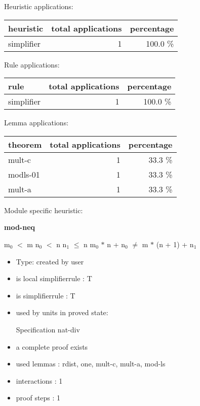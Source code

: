 \documentclass[a4paper]{article}
\begin{document}
\medskip


Heuristic applications:

\begin{supertabular}{l|r|r}
heuristic	& total applications & percentage \\ \hline
simplifier & 1 & 100.0 \% \\

\end{supertabular}

Rule applications:

\begin{supertabular}{l|r|r}
rule	        & total applications & percentage \\ \hline
simplifier & 1 & 100.0 \% \\

\end{supertabular}

Lemma applications:

\begin{supertabular}{l|r|r}
theorem	        & total applications & percentage \\ \hline
mult-c & 1 & 33.3 \% \\
modls-01 & 1 & 33.3 \% \\
mult-a & 1 & 33.3 \% \\

\end{supertabular}

Module specific heuristic:

\pagebreak

{\LARGE\bf mod-neq}\label{lemma-mod-neq}

\medskip

 \Fol $\mbox{m}_{0}$ $<$ m \And $\mbox{n}_{0}$ $<$ n \And $\mbox{n}_{1}$ $\le$ n \Imp $\mbox{m}_{0}$ $*$ n + $\mbox{n}_{0}$ $\neq$ m $*$ (n + 1) + $\mbox{n}_{1}$

\begin{itemize}

\item Type: created by user

\item is local simplifierrule : T
\item is simplifierrule : T
\item used by units in proved state:

Specification nat-div
\item       a complete proof exists
\item       used lemmas  : rdist, one, mult-c, mult-a, mod-ls
\item       interactions : 1
\item       proof steps  : 1
\end{itemize}
\end{document}
